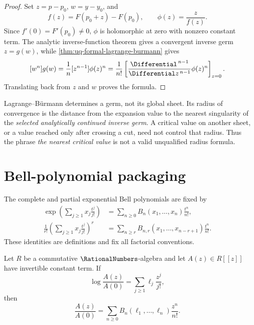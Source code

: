 \begin{proof}
Set \(z=p-p_0\), \(w=y-y_0\), and
\[
 f(z)=F(p_0+z)-F(p_0),\qquad \phi(z)=\frac{z}{f(z)}.
\]
Since \(f'(0)=F'(p_0)\ne0\), \(\phi\) is holomorphic at zero with nonzero
constant term.  The analytic inverse-function theorem gives a convergent
inverse germ \(z=g(w)\), while
\cref{thm:uq-formal-lagrange-burmann} gives
\[
 [w^n]g(w)=\frac1n[z^{n-1}]\phi(z)^n
 =\frac1{n!}\left[\frac{\Differential^{\,n-1}}{\Differential z^{\,n-1}}
 \phi(z)^n\right]_{z=0}.
\]
Translating back from \(z\) and \(w\) proves the formula.
\end{proof}

\begin{warning}
\label{warn:uq-inverse-radius}
Lagrange--B\"urmann determines a germ, not its global sheet.  Its radius of
convergence is the distance from the expansion value to the nearest
singularity of the \emph{selected analytically continued inverse germ}.
A critical value on another sheet, or a value reached only after crossing a
cut, need not control that radius.  Thus the phrase \emph{the nearest
critical value} is not a valid unqualified radius formula.
\end{warning}

\section{Bell-polynomial packaging}
\label{sec:uq-bell-packaging}

The complete and partial exponential Bell polynomials are fixed by
\begin{align}
 \exp\!\left(\sum_{j\ge1}x_j\frac{t^j}{j!}\right)
 &=\sum_{n\ge0}B_n(x_1,\ldots,x_n)\frac{t^n}{n!},
 \label{eq:uq-complete-bell-definition}\\
 \frac1{r!}\left(\sum_{j\ge1}x_j\frac{t^j}{j!}\right)^{\!r}
 &=\sum_{n\ge r}B_{n,r}(x_1,\ldots,x_{n-r+1})
   \frac{t^n}{n!}.
 \label{eq:uq-partial-bell-definition}
\end{align}
These identities are definitions and fix all factorial conventions.

\begin{lemma}
\label{lem:uq-bell-exponentiation}
Let \(R\) be a commutative \(\RationalNumbers\)-algebra and let \(A(z)\in R[[z]]\) have
invertible constant term.  If
\[
 \log\frac{A(z)}{A(0)}
 =\sum_{j\ge1}\ell_j\frac{z^j}{j!},
\]
then
\[
 \frac{A(z)}{A(0)}
 =\sum_{n\ge0}B_n(\ell_1,\ldots,\ell_n)\frac{z^n}{n!}.
\]
\end{lemma}

